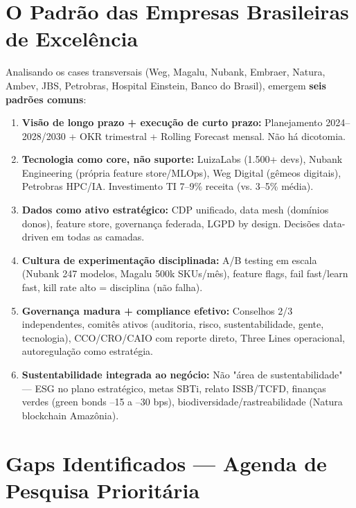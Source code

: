 \section*{O Padrão das Empresas Brasileiras de Excelência}

Analisando os cases transversais (Weg, Magalu, Nubank, Embraer, Natura, Ambev, JBS, Petrobras, Hospital Einstein, Banco do Brasil), emergem \textbf{seis padrões comuns}:

\begin{enumerate}
    \item \textbf{Visão de longo prazo + execução de curto prazo:} Planejamento 2024–2028/2030 + OKR trimestral + Rolling Forecast mensal. Não há dicotomia.
    \item \textbf{Tecnologia como core, não suporte:} LuizaLabs (1.500+ devs), Nubank Engineering (própria feature store/MLOps), Weg Digital (gêmeos digitais), Petrobras HPC/IA. Investimento TI 7–9\% receita (vs. 3–5\% média).
    \item \textbf{Dados como ativo estratégico:} CDP unificado, data mesh (domínios donos), feature store, governança federada, LGPD by design. Decisões data-driven em todas as camadas.
    \item \textbf{Cultura de experimentação disciplinada:} A/B testing em escala (Nubank 247 modelos, Magalu 500k SKUs/mês), feature flags, fail fast/learn fast, kill rate alto = disciplina (não falha).
    \item \textbf{Governança madura + compliance efetivo:} Conselhos 2/3 independentes, comitês ativos (auditoria, risco, sustentabilidade, gente, tecnologia), CCO/CRO/CAIO com reporte direto, Three Lines operacional, autoregulação como estratégia.
    \item \textbf{Sustentabilidade integrada ao negócio:} Não "área de sustentabilidade" — ESG no plano estratégico, metas SBTi, relato ISSB/TCFD, finanças verdes (green bonds –15 a –30 bps), biodiversidade/rastreabilidade (Natura blockchain Amazônia).
\end{enumerate}

\section*{Gaps Identificados — Agenda de Pesquisa Prioritária}

